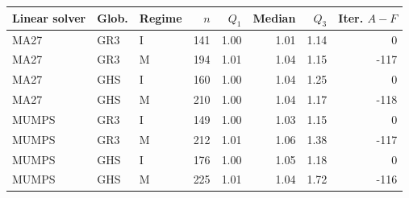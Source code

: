 \begin{tabular}{@{}lllrrrrr@{}}
\toprule
Linear solver & Glob. & Regime & $n$ & $Q_1$ & Median & $Q_3$ & Iter. $A-F$\\
\midrule
MA27 & GR3 & I & 141 & 1.00 & 1.01 & 1.14 & 0\\
MA27 & GR3 & M & 194 & 1.01 & 1.04 & 1.15 & -117\\
MA27 & GHS & I & 160 & 1.00 & 1.04 & 1.25 & 0\\
MA27 & GHS & M & 210 & 1.00 & 1.04 & 1.17 & -118\\
MUMPS & GR3 & I & 149 & 1.00 & 1.03 & 1.15 & 0\\
MUMPS & GR3 & M & 212 & 1.01 & 1.06 & 1.38 & -117\\
MUMPS & GHS & I & 176 & 1.00 & 1.05 & 1.18 & 0\\
MUMPS & GHS & M & 225 & 1.01 & 1.04 & 1.72 & -116\\
\bottomrule
\end{tabular}
